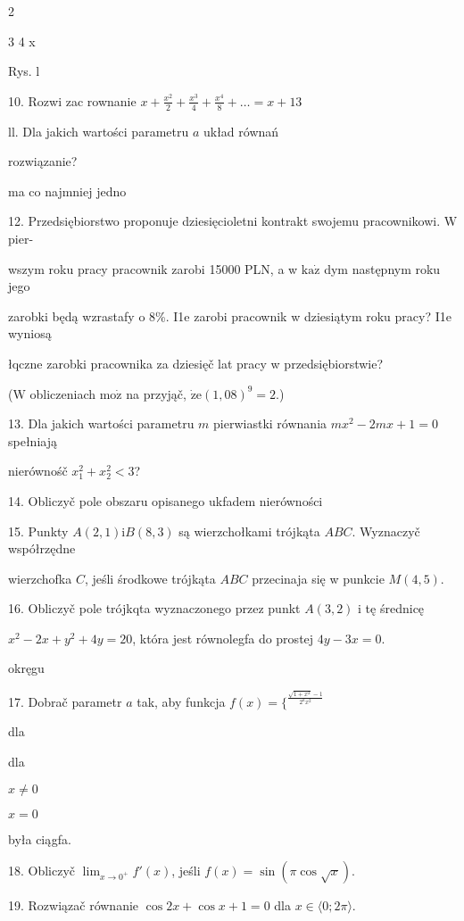 \documentclass[a4paper,12pt]{article}
\begin{document}
2

3 4 x

Rys. l

10. Rozwi zac rownanie $x+\displaystyle \frac{x^{2}}{2}+\frac{x^{3}}{4}+\frac{x^{4}}{8}+\ldots=x+13$

ll. Dla jakich wartości parametru $a$ układ równań 

rozwiązanie?

ma co najmniej jedno

12. Przedsiębiorstwo proponuje dziesięcioletni kontrakt swojemu pracownikowi. $\mathrm{W}$ pier-

wszym roku pracy pracownik zarobi 15000 PLN, a w $\mathrm{k}\mathrm{a}\dot{\mathrm{z}}$ dym następnym roku jego

zarobki będą wzrastafy o 8\%. I1e zarobi pracownik w dziesiątym roku pracy? I1e wyniosą

łqczne zarobki pracownika za dziesięč lat pracy w przedsiębiorstwie?

($\mathrm{W}$ obliczeniach $\mathrm{m}\mathrm{o}\dot{\mathrm{z}}$ na przyjąč, $\dot{\mathrm{z}}\mathrm{e}(1,08)^{9}=2.$)

13. Dla jakich wartości parametru $m$ pierwiastki równania $mx^{2}-2mx+1=0$ spełniają

nierównośč $x_{1}^{2}+x_{2}^{2}<3$?




14. Obliczyč pole obszaru opisanego ukfadem nierówności 

15. Punkty $A(2,1) \mathrm{i} B(8,3)$ są wierzchołkami trójkąta $ABC$. Wyznaczyč współrzędne

wierzchofka $C$, jeśli środkowe trójkąta $ABC$ przecinaja się w punkcie $M(4,5).$

16. Obliczyč pole trójkqta wyznaczonego przez punkt $A(3,2)$ i tę średnicę

$x^{2}-2x+y^{2}+4y=20$, która jest równolegfa do prostej $4y-3x=0.$

okręgu

17. Dobrač parametr $a$ tak, aby funkcja $f(x)=\{^{\frac{\sqrt{1+x^{2}}-1}{2^{a}x^{2}}}$

dla

dla

$x\neq 0$

$x=0$

była ciągfa.

18. Obliczyč $\displaystyle \lim_{x\rightarrow 0^{+}}f'(x)$, jeśli $f(x)=\sin(\pi\cos\sqrt{x}).$

19. Rozwiązač równanie $\cos 2x+\cos x+1=0$ dla $x\in\langle 0;2\pi\rangle.$
\end{document}
